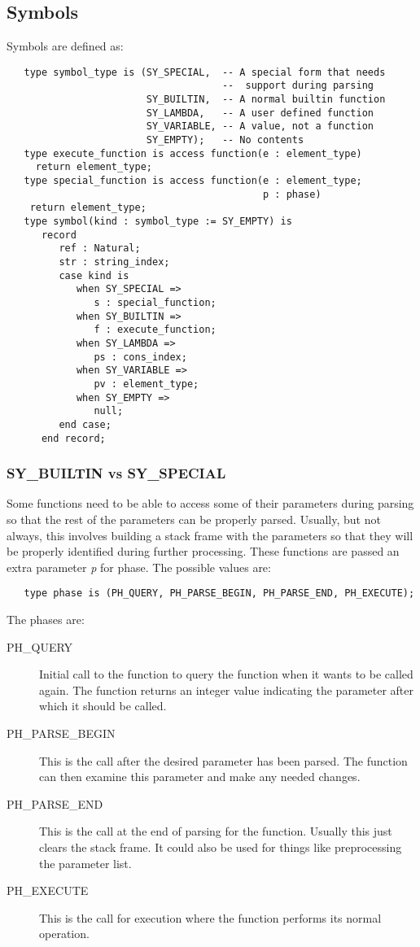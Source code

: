 \documentclass[10pt, openany]{book}
\begin{document}
\subsection{Symbols}
Symbols are defined as:
\begin{lstlisting}
   type symbol_type is (SY_SPECIAL,  -- A special form that needs
                                     --  support during parsing
                        SY_BUILTIN,  -- A normal builtin function
                        SY_LAMBDA,   -- A user defined function
                        SY_VARIABLE, -- A value, not a function
                        SY_EMPTY);   -- No contents
   type execute_function is access function(e : element_type)
     return element_type;
   type special_function is access function(e : element_type;
                                            p : phase)
    return element_type;
   type symbol(kind : symbol_type := SY_EMPTY) is
      record
         ref : Natural;
         str : string_index;
         case kind is
            when SY_SPECIAL =>
               s : special_function;
            when SY_BUILTIN =>
               f : execute_function;
            when SY_LAMBDA =>
               ps : cons_index;
            when SY_VARIABLE =>
               pv : element_type;
            when SY_EMPTY =>
               null;
         end case;
      end record;
\end{lstlisting}

\subsubsection{SY\_BUILTIN vs SY\_SPECIAL}
Some functions need to be able to access some of their parameters during parsing so that the rest of the parameters can be properly parsed.  Usually, but not always, this involves building a stack frame with the parameters so that they will be properly identified during further processing.  These functions are passed an extra parameter \emph{p} for phase.  The possible values are:
\begin{lstlisting}
   type phase is (PH_QUERY, PH_PARSE_BEGIN, PH_PARSE_END, PH_EXECUTE);
\end{lstlisting}

The phases are:
\begin{description}
  \item[PH\_QUERY] Initial call to the function to query the function when it wants to be called again.  The function returns an integer value indicating the parameter after which it should be called.
  \item[PH\_PARSE\_BEGIN] This is the call after the desired parameter has been parsed.  The function can then examine this parameter and make any needed changes.
  \item[PH\_PARSE\_END] This is the call at the end of parsing for the function.  Usually this just clears the stack frame.  It could also be used for things like preprocessing the parameter list.
  \item[PH\_EXECUTE] This is the call for execution where the function performs its normal operation.
\end{description}
\end{document}
